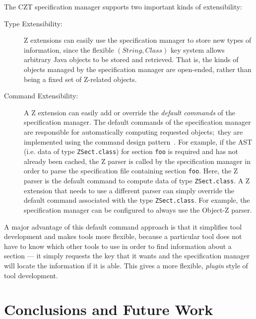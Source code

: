 \documentclass{llncs}
\newcommand{\Interface}[1]{\texttt{#1}}
\begin{document}
  The CZT specification manager supports two important kinds of
  extensibility:
  \begin{description}
  \item[Type Extensibility:] Z extensions can easily use the
    specification manager to store new types of information, since the
    flexible $(String,Class)$ key system allows arbitrary Java objects
    to be stored and retrieved.  That is, the kinds of objects managed
    by the specification manager are open-ended, rather than being a
    fixed set of Z-related objects.
  \item[Command Extensibility:] A Z extension can easily add or
    override the \emph{default commands} of the specification manager.
    The default commands of the specification manager are responsible
    for automatically computing requested objects;~they are
    implemented using the command design pattern~\cite{GamEA:95}. For
    example, if the AST (i.e. data of type \Interface{ZSect.class})
    for section \texttt{foo} is required and has not already been
    cached, the Z parser is called by the specification manager in
    order to parse the specification file containing section
    \texttt{foo}.  Here, the Z parser is the default command to
    compute data of type \Interface{ZSect.class}.  A Z extension that
    needs to use a different parser can simply override the default
    command associated with the type \Interface{ZSect.class}.  For
    example, the specification manager can be configured to always use
    the Object-Z parser.
    \end{description}

  A major advantage of this default command approach is that it
  simplifies tool development and makes tools more flexible, because a
  particular tool does not have to know which other tools to use in
  order to find information about a section --- it simply requests the
  key that it wants and the specification manager will locate the
  information if it is able.  This gives a more flexible,
  \emph{plugin} style of tool development.

\section{Conclusions and Future Work} \label{sec:conclusions}



\end{document}
